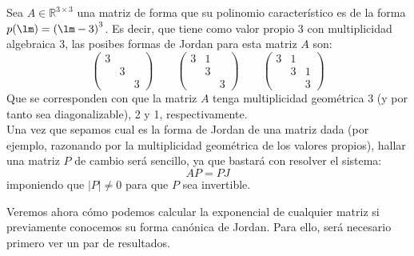 \begin{ejemplo}
    Sea $A\in \mathbb{R}^{3\times 3}$ una matriz de forma que su polinomio característico es de la forma $p(\lm) = {(\lm-3)}^{3}$. Es decir, que tiene como valor propio 3 con multiplicidad algebraica 3, las posibes formas de Jordan para esta matriz $A$ son:
    \begin{equation*}
        \left(\begin{array}{ccc}
                3 & & \\
                  &3  & \\
                  &  &3 
        \end{array}\right) \qquad 
        \left(\begin{array}{ccc}
                3 & 1& \\
                  &3  & \\
                  &  &3 
        \end{array}\right)\qquad 
        \left(\begin{array}{ccc}
                3 & 1& \\
                  &3  & 1 \\
                  &  &3 
        \end{array}\right)
    \end{equation*}
    Que se corresponden con que la matriz $A$ tenga multiplicidad geométrica 3 (y por tanto sea diagonalizable), 2 y 1, respectivamente.\\

    Una vez que sepamos cual es la forma de Jordan de una matriz dada (por ejemplo, razonando por la multiplicidad geométrica de los valores propios), hallar una matriz $P$ de cambio será sencillo, ya que bastará con resolver el sistema:
    \begin{equation*}
        AP = PJ
    \end{equation*}
    imponiendo que $|P|\neq 0$ para que $P$ sea invertible.
\end{ejemplo}

Veremos ahora cómo podemos calcular la exponencial de cualquier matriz si previamente conocemos su forma canónica de Jordan. Para ello, será necesario primero ver un par de resultados.

